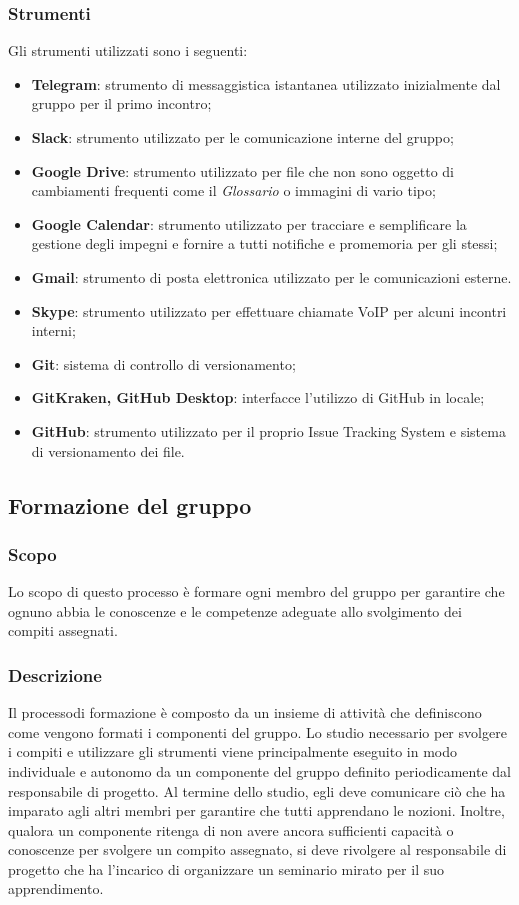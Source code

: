 		\subsubsection{Strumenti}
			Gli strumenti utilizzati sono i seguenti:
			\begin{itemize}
				\item \textbf{Telegram}\glo: strumento di messaggistica istantanea utilizzato inizialmente dal gruppo per il primo incontro;
				\item \textbf{Slack}\glo: strumento utilizzato per le comunicazione interne del gruppo;
				\item \textbf{Google Drive}: strumento utilizzato per file che non sono oggetto di cambiamenti frequenti come il \textit{Glossario} o immagini di vario tipo;
				\item \textbf{Google Calendar}: strumento utilizzato per tracciare e semplificare la gestione degli impegni e fornire a tutti notifiche e promemoria per gli stessi;
				\item \textbf{Gmail}: strumento di posta elettronica utilizzato per le comunicazioni esterne.
				\item \textbf{Skype}: strumento utilizzato per effettuare chiamate VoIP per alcuni incontri interni;
				\item \textbf{Git}: sistema di controllo di versionamento;
				\item \textbf{GitKraken, GitHub Desktop}: interfacce l'utilizzo di GitHub in locale;
				\item \textbf{GitHub}: strumento utilizzato per il proprio Issue Tracking System e sistema di versionamento dei file.
			\end{itemize}
	\subsection{Formazione del gruppo}
		\subsubsection{Scopo}
			Lo scopo di questo processo è formare ogni membro del gruppo per garantire che ognuno abbia le conoscenze e le competenze adeguate allo svolgimento dei compiti assegnati.
		\subsubsection{Descrizione}
			Il processo\glosp di formazione è composto da un insieme di attività che definiscono come vengono formati i componenti del gruppo.
			Lo studio necessario per svolgere i compiti e utilizzare gli strumenti viene principalmente eseguito in modo individuale e autonomo da un componente del gruppo definito periodicamente dal responsabile di progetto\glo. Al termine dello studio, egli deve comunicare ciò che ha imparato agli altri membri per garantire che tutti apprendano le nozioni.
			Inoltre, qualora un componente ritenga di non avere ancora sufficienti capacità o conoscenze per svolgere un compito assegnato, si deve rivolgere al responsabile di progetto che ha l'incarico di organizzare un seminario mirato per il suo apprendimento.
			
